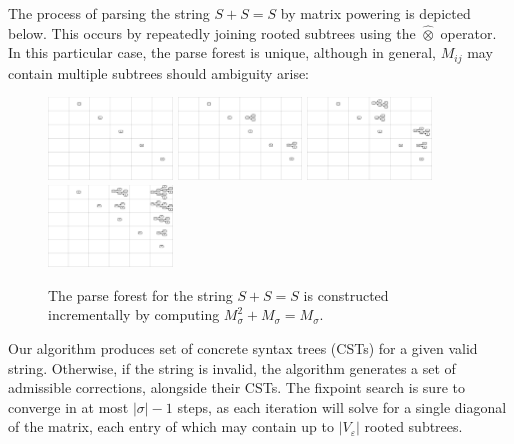 \documentclass[sigplan,review,anonymous,acmsmall]{acmart}\settopmatter{printfolios=false,printccs=false,printacmref=false}
\begin{document}

The process of parsing the string $S + S = S$ by matrix powering is depicted below. This occurs by repeatedly joining rooted subtrees using the $\hat{\otimes}$ operator. In this particular case, the parse forest is unique, although in general, $M_{ij}$ may contain multiple subtrees should ambiguity arise:

\begin{figure}[H]
    \includegraphics[width=3.305cm]{../figures/parse1.png}
    \includegraphics[width=3.298cm]{../figures/parse2.png}
    \includegraphics[width=3.3cm]{../figures/parse3.png}
    \includegraphics[width=3.32cm]{../figures/parse4.png}
  \caption{The parse forest for the string $S + S = S$ is constructed incrementally by computing $M_\sigma^2 + M_\sigma = M_\sigma$.}
\end{figure}

Our algorithm produces set of concrete syntax trees (CSTs) for a given valid string. Otherwise, if the string is invalid, the algorithm generates a set of admissible corrections, alongside their CSTs. The fixpoint search is sure to converge in at most $|\sigma| - 1$ steps, as each iteration will solve for a single diagonal of the matrix, each entry of which may contain up to $|V_\varepsilon|$ rooted subtrees.
\end{document}
